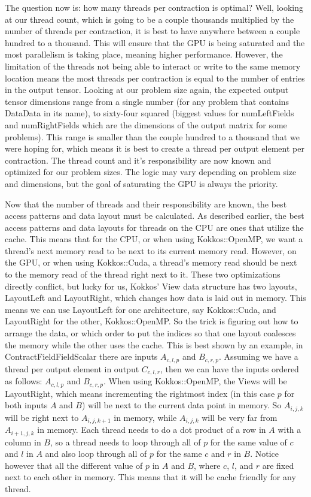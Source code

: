 The question now is: how many threads per contraction is optimal? Well, looking at our thread count, which is going to be a couple thousands multiplied by the number of threads per contraction, it is best to have anywhere between a couple hundred to a thousand. This will ensure that the GPU is being saturated and the most parallelism is taking place, meaning higher performance. However, the limitation of the threads not being able to interact or write to the same memory location means the most threads per contraction is equal to the number of entries in the output tensor. Looking at our problem size again, the expected output tensor dimensions range from a single number (for any problem that contains DataData in its name), to sixty-four squared (biggest values for numLeftFields and numRightFields which are the dimensions of the output matrix for some problems). This range is smaller than the couple hundred to a thousand that we were hoping for, which means it is best to create a thread per output element per contraction. The thread count and it's responsibility are now known and optimized for our problem sizes. The logic may vary depending on problem size and dimensions, but the goal of saturating the GPU is always the priority.

Now that the number of threads and their responsibility are known, the best access patterns and data layout must be calculated. As described earlier, the best access patterns and data layouts for threads on the CPU are ones that utilize the cache. This means that for the CPU, or when using Kokkos::OpenMP, we want a thread's next memory read to be next to its current memory read. However, on the GPU, or when using Kokkos::Cuda, a thread's memory read should be next to the memory read of the thread right next to it. These two optimizations directly conflict, but lucky for us, Kokkos' View data structure has two layouts, LayoutLeft and LayoutRight, which changes how data is laid out in memory. This means we can use LayoutLeft for one architecture, say Kokkos::Cuda, and LayoutRight for the other, Kokkos::OpenMP. So the trick is figuring out how to arrange the data, or which order to put the indices so that one layout coalesces the memory while the other uses the cache. This is best shown by an example, in ContractFieldFieldScalar there are inputs $A_{c, l, p}$ and $B_{c, r, p}$. Assuming we have a thread per output element in output $C_{c, l, r}$, then we can have the inputs ordered as follows: $A_{c, l, p}$ and $B_{c, r, p}$. When using Kokkos::OpenMP, the Views will be LayoutRight, which means incrementing the rightmost index (in this case $p$ for both inputs $A$ and $B$) will be next to the current data point in memory. So $A_{i, j, k}$ will be right next to $A_{i, j, k+1}$ in memory, while $A_{i, j, k}$ will be very far from $A_{i+1, j, k}$ in memory. Each thread needs to do a dot product of a row in $A$ with a column in $B$, so a thread needs to loop through all of $p$ for the same value of $c$ and $l$ in $A$ and also loop through all of $p$ for the same $c$ and $r$ in $B$. Notice however that all the different value of $p$ in $A$ and $B$, where $c$, $l$, and $r$ are fixed next to each other in memory. This means that it will be cache friendly for any thread. 

